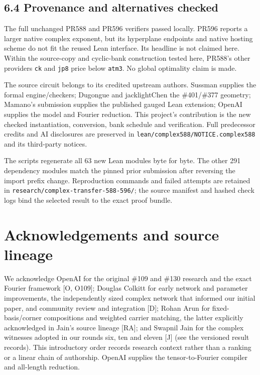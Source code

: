\documentclass[
  11pt,
]{article}
\begin{document}
\subsection{6.4 Provenance and alternatives
checked}\label{provenance-and-alternatives-checked}

The full unchanged PR588 and PR596 verifiers passed locally. PR596
reports a larger native complex exponent, but its hyperplane endpoints
and native hosting scheme do not fit the reused Lean interface. Its
headline is not claimed here. Within the source-copy and cyclic-bank
construction tested here, PR588's other providers \texttt{ck} and
\texttt{jp8} price below \texttt{atm3}. No global optimality claim is
made.

The source circuit belongs to its credited upstream authors. Sussman
supplies the formal engine/checkers; Dugongue and jacklightChen the
\#401/\#377 geometry; Mamano's submission supplies the published gauged
Lean extension; OpenAI supplies the model and Fourier reduction. This
project's contribution is the new checked instantiation, conversion,
bank schedule and verification. Full predecessor credits and AI
disclosures are preserved in \texttt{lean/\allowbreak{}complex588/\allowbreak{}NOTICE.complex588}
and its third-party notices.

The scripts regenerate all 63 new Lean modules byte for byte. The other
291 dependency modules match the pinned prior submission after reversing
the import prefix change. Reproduction commands and failed attempts are
retained in \texttt{research/\allowbreak{}complex-transfer-588-596/\allowbreak{}}; the source
manifest and hashed check logs bind the selected result to the exact
proof bundle.

\section{Acknowledgements and source
lineage}\label{acknowledgements-and-source-lineage}

We acknowledge OpenAI for the original \#109 and \#130 research and the
exact Fourier framework {[}O, O109{]}; Douglas Colkitt for early network
and parameter improvements, the independently sized complex network that
informed our initial paper, and community review and integration
{[}D{]}; Rohan Arun for fixed-basis/corner compositions and weighted
carrier matching, the latter explicitly acknowledged in Jain's source
lineage {[}RA{]}; and Swapnil Jain for the complex witnesses adopted in
our rounds six, ten and eleven {[}J{]} (see the versioned result
records). This introductory order records research context rather than a
ranking or a linear chain of authorship. OpenAI supplies the
tensor-to-Fourier compiler and all-length reduction.
\end{document}
